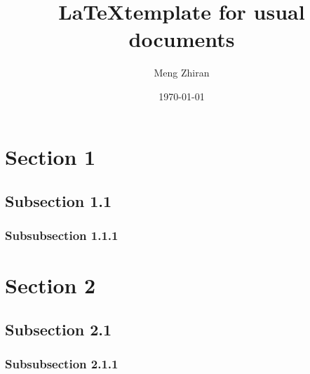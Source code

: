 \documentclass[a4paper,12pt]{article}
\title{\textbf{\LaTeX template for usual documents}}
\author{Meng Zhiran}
\date{\today}
\begin{document}
\maketitle
\thispagestyle{fancy}


\section{Section 1}
\lipsum[1] %

\subsection{Subsection 1.1}
\lipsum[2-3] %

\subsubsection{Subsubsection 1.1.1}
\lipsum[4-5] %

\section{Section 2}
\lipsum[6] %

\subsection{Subsection 2.1}
\lipsum[7-8] %

\subsubsection{Subsubsection 2.1.1}
\lipsum[9-10] %
\end{document}
